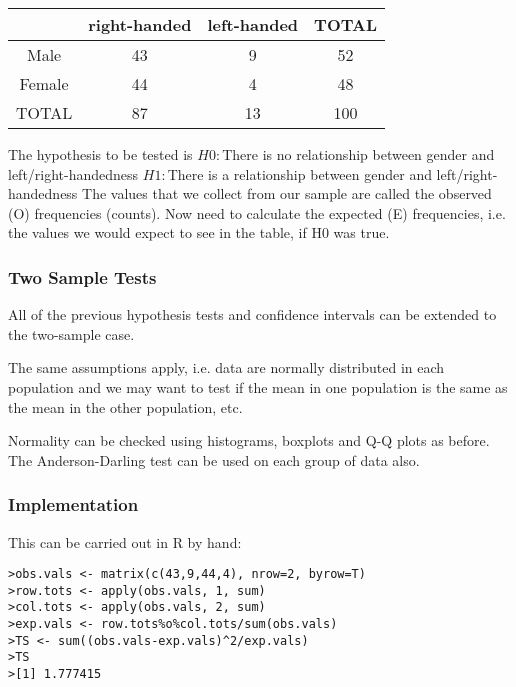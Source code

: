 \begin{tabular}{|c|c|c|c|}
	\hline
	& right-handed &left-handed & TOTAL\\\hline
	Male & 43 & 9 & 52 \\
	Female & 44 & 4 & 48 \\
	TOTAL & 87 & 13 & 100 \\
	\hline
\end{tabular}


The hypothesis to be tested is
$H0 :$There is no relationship between gender and left/right-handedness
$H1 :$There is a relationship between gender and left/right-handedness
The values that we collect from our sample are called the observed
(O) frequencies (counts). Now need to calculate the expected (E)
frequencies, i.e. the values we would expect to see in the table, if
H0 was true.






\subsubsection{Two Sample Tests}


All of the previous hypothesis tests and confidence intervals can be
extended to the two-sample case.

The same assumptions apply, i.e. data are normally distributed in
each population and we may want to test if the mean in one
population is the same as the mean in the other population, etc.

Normality can be checked using histograms, boxplots and Q-Q
plots as before. The Anderson-Darling test can be used on
each group of data also.


\subsubsection{Implementation}

This can be carried out in R by hand:

\footnotesize \begin{verbatim}
>obs.vals <- matrix(c(43,9,44,4), nrow=2, byrow=T)
>row.tots <- apply(obs.vals, 1, sum)
>col.tots <- apply(obs.vals, 2, sum)
>exp.vals <- row.tots%o%col.tots/sum(obs.vals)
>TS <- sum((obs.vals-exp.vals)^2/exp.vals)
>TS
>[1] 1.777415
\end{verbatim}\normalsize

